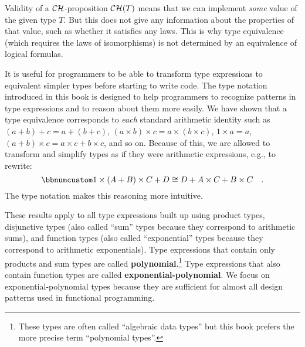 Validity of a ${\cal CH}$-proposition ${\cal CH}(T)$ means that
we can implement \emph{some} value of the given type $T$. But this
does not give any information about the properties of that value,
such as whether it satisfies any laws. This is why type equivalence
(which requires the laws of isomorphisms) is not determined by an
equivalence of logical formulas.

It is useful for programmers to be able to transform type expressions
to equivalent simpler types before starting to write code. The type
notation introduced in this book is designed to help programmers to
recognize patterns in type expressions and to reason about them more
easily. We have shown that a type equivalence corresponds to \emph{each}
standard arithmetic identity such as $\left(a+b\right)+c=a+\left(b+c\right)$,
$\left(a\times b\right)\times c=a\times(b\times c)$, $1\times a=a$,
$\left(a+b\right)\times c=a\times c+b\times c$, and so on. Because
of this, we are allowed to transform and simplify types as if they
were arithmetic expressions, e.g., to rewrite:
\[
\bbnum 1\times\left(A+B\right)\times C+D\cong D+A\times C+B\times C\quad.
\]
The type notation makes this reasoning more intuitive. 

These results apply to all type expressions built up using product
types, disjunctive types (also called \textsf{``}sum\textsf{''} types because they
correspond to arithmetic sums), and function types (also called \textsf{``}exponential\textsf{''}
types because they correspond to arithmetic exponentials). Type expressions
that contain only products and sum types are called \textbf{polynomial}.\footnote{These types are often called \textsf{``}algebraic data types\textsf{''}
but this book prefers the more precise term \textsf{``}polynomial types\textsf{''}.} Type expressions that also contain function types are called \textbf{exponential-polynomial}.
We focus on exponential-polynomial types because they are sufficient
for almost all design patterns used in functional programming.

